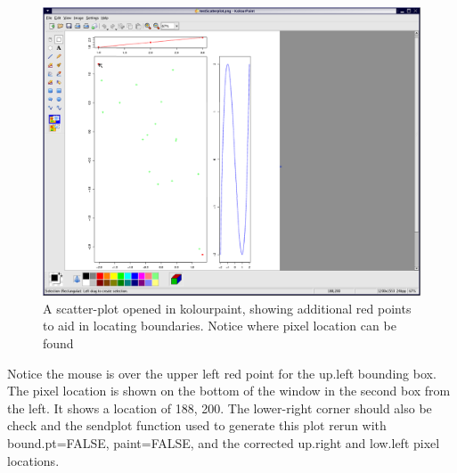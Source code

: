 \documentclass[]{article}
\begin{document}
\begin{center}
\begin{figure}
\includegraphics{sendPlot2}
\caption{A scatter-plot opened in kolourpaint, showing additional red points to aid in locating boundaries. Notice where pixel location can be found}
\end{figure}
\end{center}

\indent  Notice the mouse is over the upper left red point for the up.left bounding box. The pixel location is shown on the bottom of the window in the second box from the left. It shows a location of 188, 200. The lower-right corner should also be check and the sendplot function used to generate this plot rerun with bound.pt=FALSE, paint=FALSE, and the corrected up.right and low.left pixel locations. \\
\end{document}
